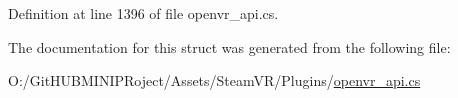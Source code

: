 Definition at line 1396 of file openvr\+\_\+api.\+cs.



The documentation for this struct was generated from the following file\+:\begin{DoxyCompactItemize}
\item 
O\+:/\+Git\+H\+U\+B\+M\+I\+N\+I\+P\+Roject/\+Assets/\+Steam\+V\+R/\+Plugins/\mbox{\hyperlink{openvr__api_8cs}{openvr\+\_\+api.\+cs}}\end{DoxyCompactItemize}
